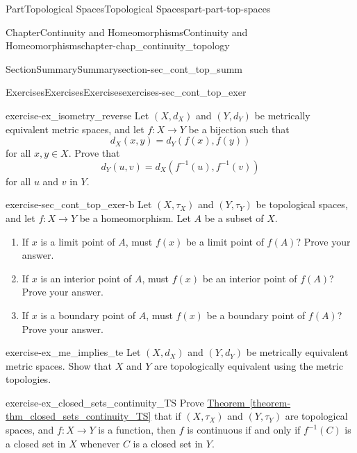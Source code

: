 \documentclass[oneside,10pt,]{book}
\newcommand{\xreffont}{\relax}
\numberwithin{equation}{chapter}
\begin{document}
\begin{partptx}{Part}{Topological Spaces}{}{Topological Spaces}{}{}{part-part-top-spaces}
\begin{chapterptx}{Chapter}{Continuity and Homeomorphisms}{}{Continuity and Homeomorphisms}{}{}{chapter-chap_continuity_topology}
\begin{sectionptx}{Section}{Summary}{}{Summary}{}{}{section-sec_cont_top_summ}
%
\end{sectionptx}
%
%
\typeout{************************************************}
\typeout{************************************************}
%
\begin{exercises-section}{Exercises}{Exercises}{}{Exercises}{}{}{exercises-sec_cont_top_exer}
\begin{divisionexercise}{1}{}{}{exercise-ex_isometry_reverse}%
Let \((X,d_X)\) and \((Y,d_Y)\) be metrically equivalent metric spaces, and let \(f:X \to Y\) be a bijection such that%
\begin{equation*}
d_X(x,y) = d_Y(f(x),f(y))
\end{equation*}
for all \(x,y \in X\). Prove that%
\begin{equation*}
d_Y(u,v) = d_X(f^{-1}(u), f^{-1}(v))
\end{equation*}
for all \(u\) and \(v\) in \(Y\).%
\end{divisionexercise}%
\begin{divisionexercise}{2}{}{}{exercise-sec_cont_top_exer-b}%
Let \((X, \tau_X)\) and \((Y, \tau_Y)\) be topological spaces, and let \(f : X \to Y\) be a homeomorphism. Let \(A\) be a subset of \(X\).%
\begin{enumerate}[font=\bfseries,label=(\alph*),ref=\alph*]%
\item{}If \(x\) is a limit point of \(A\), must \(f(x)\) be a limit point of \(f(A)\)? Prove your answer.%
\item{}If \(x\) is an interior point of \(A\), must \(f(x)\) be an interior point of \(f(A)\)? Prove your answer.%
\item{}If \(x\) is a boundary point of \(A\), must \(f(x)\) be a boundary point of \(f(A)\)? Prove your answer.%
\end{enumerate}%
\end{divisionexercise}%
\begin{divisionexercise}{3}{}{}{exercise-ex_me_implies_te}%
Let \((X, d_X)\) and \((Y, d_Y)\) be metrically equivalent metric spaces. Show that \(X\) and \(Y\) are topologically equivalent using the metric topologies.%
\end{divisionexercise}%
\begin{divisionexercise}{4}{}{}{exercise-ex_closed_sets_continuity_TS}%
Prove \hyperref[theorem-thm_closed_sets_continuity_TS]{Theorem~{\xreffont\ref{theorem-thm_closed_sets_continuity_TS}}} that if \((X,\tau_X)\) and \((Y, \tau_Y)\) are topological spaces, and \(f: X \to Y\) is a function, then \(f\) is continuous if and only if \(f^{-1}(C)\) is a closed set in \(X\) whenever \(C\) is a closed set in \(Y\).%

\end{divisionexercise}
\end{exercises-section}
\end{chapterptx}
\end{partptx}
\end{document}
